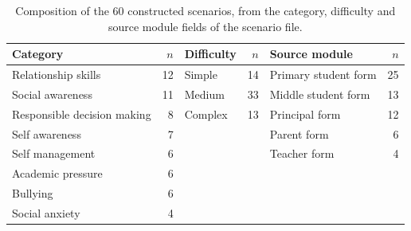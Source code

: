 \begin{table}[!htbp]
\caption{Composition of the 60 constructed scenarios, from the category, difficulty and source module fields of the scenario file.}\label{tab:scenarios}
\centering\small
\begin{tabular}{@{}lrlrlr@{}}
\toprule
Category & $n$ & Difficulty & $n$ & Source module & $n$ \\ \midrule
Relationship skills & 12 & Simple & 14 & Primary student form & 25 \\
Social awareness & 11 & Medium & 33 & Middle student form & 13 \\
Responsible decision making & 8 & Complex & 13 & Principal form & 12 \\
Self awareness & 7 &  &  & Parent form & 6 \\
Self management & 6 &  &  & Teacher form & 4 \\
Academic pressure & 6 &  &  &  &  \\
Bullying & 6 &  &  &  &  \\
Social anxiety & 4 &  &  &  &  \\
\bottomrule
\end{tabular}
\end{table}
